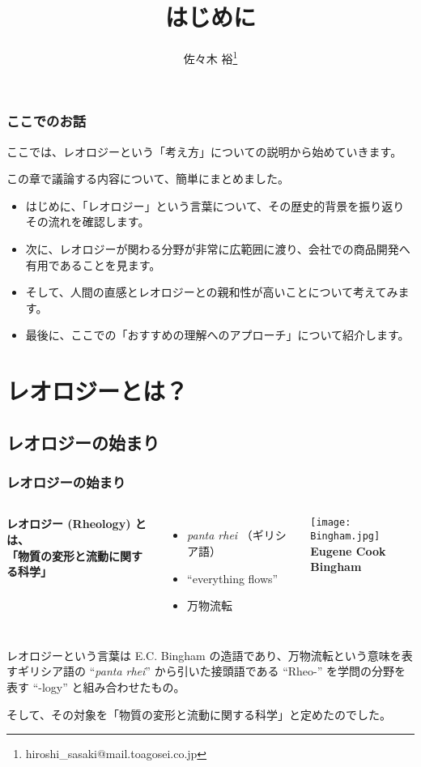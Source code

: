 \documentclass[12pt, dvipdfmx]{beamer}
\title
[はじめに]
{はじめに}
\author[東亞合成　佐々木]{佐々木 裕\thanks{hiroshi\_sasaki@mail.toagosei.co.jp}}
\institute[東亞合成]{東亞合成株式会社}
\date{}
\begin{document}
\maketitle

\begin{frame}
\tableofcontents
\end{frame}

\begin{frame}
	\frametitle{ここでのお話}
		ここでは、レオロジーという「考え方」についての説明から始めていきます。
		
		この章で議論する内容について、簡単にまとめました。
		\begin{itemize}
			\item はじめに、「レオロジー」という言葉について、その歴史的背景を振り返りその流れを確認します。
			\item 次に、レオロジーが関わる分野が非常に広範囲に渡り、会社での商品開発へ有用であることを見ます。
			\item そして、人間の直感とレオロジーとの親和性が高いことについて考えてみます。
			\item 最後に、ここでの「おすすめの理解へのアプローチ」について紹介します。
		\end{itemize}
\end{frame}

\section{レオロジーとは？}
\subsection{レオロジーの始まり}
\begin{frame}
	\frametitle{レオロジーの始まり}
	\begin{columns}[T, onlytextwidth]
		{\bf
		レオロジー (Rheology) とは、\\
		「物質の変形と流動に関する科学」
		\begin{itemize}
			\item \textit{panta rhei} （ギリシア語）
			\item ``everything flows''
			\item 万物流転
		\end{itemize}
		}
		\normalsize
		\begin{center}
			\texttt{[image: Bingham.jpg]}\\
			\scriptsize{\bf Eugene Cook Bingham}
		\end{center}
	\end{columns}
	\vspace{2mm}
	\small
	レオロジーという言葉は E.C. Bingham の造語であり、万物流転という意味を表すギリシア語の ``\textit{panta rhei}'' から引いた接頭語である ``Rheo-'' を学問の分野を表す ``-logy'' と組み合わせたもの。

	そして、その対象を「物質の変形と流動に関する科学」と定めたのでした。
\end{frame}
\end{document}
